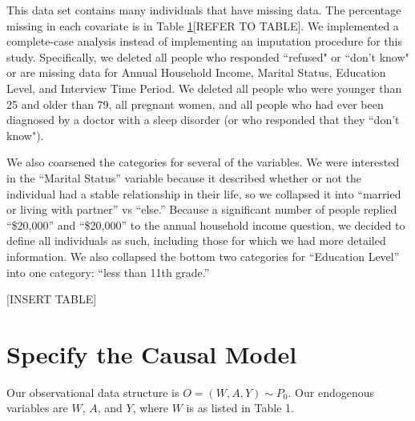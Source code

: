\documentclass{article}
\begin{document}
\vspace{0.5cm}

This data set contains many individuals that have missing data.  The percentage missing in each covariate is in Table \ref{}[REFER TO TABLE].  We implemented a complete-case analysis instead of implementing an imputation procedure for this study. Specifically, we deleted all people who responded ``refused" or ``don't know" or are missing data for Annual Household Income, Marital Status, Education Level, and Interview Time Period.  We deleted all people who were younger than 25 and older than 79, all pregnant women, and all people who had ever been diagnosed by a doctor with a sleep disorder (or who responded that they ``don't know").  

We also coarsened the categories for several of the variables.  We were interested in the ``Marital Status'' variable because it described whether or not the individual had a stable relationship in their life, so we collapsed it into ``married or living with partner'' vs ``else.''  Because a significant number of people replied ``\$20,000'' and ``\$20,000'' to the annual household income question, we decided to define all individuals as such, including those for which we had more detailed information.  We also collapsed the bottom two categories for ``Education Level'' into one category: ``less than 11th grade.''

[INSERT TABLE]

% 
% 

\section{Specify the Causal Model}

Our observational data structure is $O=(W,A,Y) \sim P_0$. Our endogenous variables are $W$, $A$, and $Y$, where $W$ is as listed in Table 1.
\end{document}
